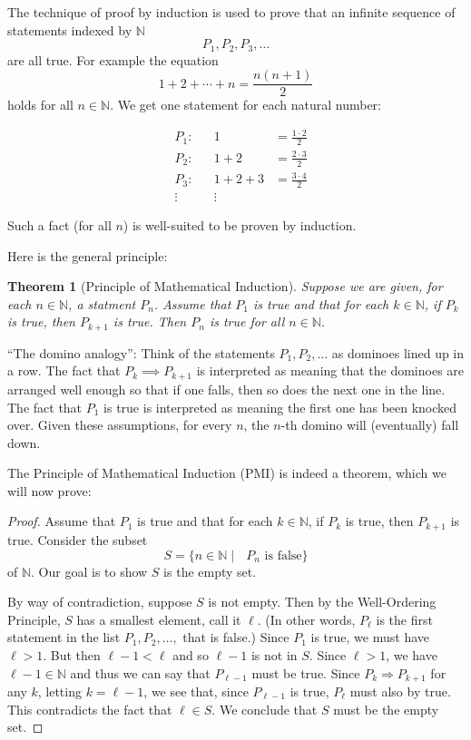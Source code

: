 \documentclass[12pt]{amsart}
\newcommand{\N}{\mathbb{N}}
\numberwithin{equation}{section}
\theoremstyle{plain} %
\newtheorem{thm}[equation]{Theorem}
\theoremstyle{definition}
\theoremstyle{remark}
\begin{document}
The technique of proof by induction is used to prove that an infinite sequence of statements indexed by $\N$
$$
P_1, P_2, P_3, \dots
$$
are all true. For example the equation
$$
1 + 2 + \cdots + n = \frac{n(n+1)}{2}
$$
holds for all $n \in \N$. We get one statement for each natural number:

\[\begin{array}{ccrrl}
	&P_1: &&1 &= \displaystyle\frac{1 \cdot 2}{2}\\[10pt]
		&P_2: &&1 + 2 &=\displaystyle\frac{2 \cdot 3}{2}\\[10pt]
		&P_3: &&1 +2 + 3 &=\displaystyle\frac{3 \cdot 4}{2}\\[10pt]
		&\vdots &&\vdots&
	\end{array}\]

Such a fact (for all $n$) is well-suited to be proven by induction.

Here is the general principle:

\begin{thm}[Principle of Mathematical Induction] Suppose we are given, for each $n \in \N$, a statment $P_n$.  
Assume that $P_1$ is true and that for each $k
  \in \N$, if $P_k$ is true, then $P_{k+1}$ is true. Then $P_n$ is true for all $n \in \N$.
\end{thm}

``The domino analogy'': Think of the statements $P_1, P_2, \dots$ as dominoes lined up in a row. The fact that $P_k \implies P_{k+1}$ is interpreted as meaning
that the dominoes
are arranged well enough so that if one falls, then so does the next one in the line. The fact that $P_1$ is true is interpreted as meaning the first one has been knocked
over. Given these assumptions, for every $n$, the $n$-th domino will (eventually) fall down. 



The Principle of Mathematical Induction (PMI) is indeed a theorem, which we will now prove:

\begin{proof} 
Assume that $P_1$ is true and that for each $k
  \in \N$, if $P_k$ is true, then $P_{k+1}$ is true.
Consider the subset
$$
S = \{n \in \N \mid \text{ $P_n$ is false} \}
$$
of $\N$. Our goal is to show $S$ is the empty set. 

By way of contradiction, suppose $S$ is not empty. Then
by the Well-Ordering Principle, $S$ has a smallest element, call it $\ell$. (In other words, $P_\ell$ is the first statement in the list $P_1, P_2, \dots, $
that is false.) Since $P_1$ is true, we must have $\ell > 1$. But then
$\ell-1 < \ell$ and so $\ell-1$ is not in $S$. Since $\ell > 1$, we have $\ell-1 \in
\N$ and thus we can say that $P_{\ell-1}$ must be true. 
Since $P_k \Rightarrow P_{k+1}$ for any $k$,  letting $k = \ell-1$, we see that, since $P_{\ell-1}$ is true, $P_{\ell}$ must also by true. This contradicts the fact that $\ell \in S$. We
conclude that $S$ must be the empty set.
\end{proof}
\end{document}
